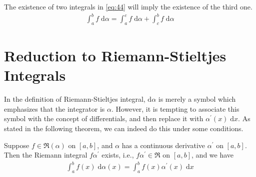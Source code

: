 \documentclass[thmcnt=section, 12pt]{my-elegantbook}
\begin{document}
\begin{theorem} \label{thm:25}
    The existence of two integrals in \eqref{eq:44} will imply the existence of the third one.
    \begin{align}
        \int_a^b f \; \mathrm{d}\alpha
        = \int_a^c f \; \mathrm{d}\alpha
        + \int_c^b f \; \mathrm{d}\alpha
        \label{eq:44}
    \end{align}
\end{theorem}


\section{Reduction to Riemann-Stieltjes Integrals}

\par In the definition of Riemann-Stieltjes integral, $\mathrm{d} \alpha$ is merely a symbol which emphasizes that the integrator is $\alpha$. However, it is tempting to associate this symbol with the concept of differentials, and then replace it with $\alpha^\prime(x) \; \mathrm{d} x$. As stated in the following theorem, we can indeed do this under some conditions.

\begin{theorem} \label{thm:23}
    Suppose $f \in \mathfrak{R}(\alpha)$ on $[a, b]$, and $\alpha$ has a continuous derivative $\alpha^\prime$ on $[a, b]$. Then the Riemann integral $f \alpha^\prime$ exists, i.e., $f \alpha^\prime \in \mathfrak{R}$ on $[a, b]$, and we have 
    \begin{align}
        \int_{a}^{b} f(x) \; \mathrm{d}\alpha(x)
        = \int_{a}^{b} f(x) \alpha^\prime(x) \; \mathrm{d}x
        \label{eq:38}
    \end{align}
\end{theorem}
\end{document}
